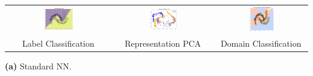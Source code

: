 \documentclass{article}
\begin{document}
\begin{minipage}{0.8\linewidth}
\centering
\begin{tabular}{ccc}
\includegraphics[width=0.3\textwidth]{DANN/label_decision_vanilla.png} &
\includegraphics[width=0.3\textwidth]{DANN/feature_vanilla.png} &
\includegraphics[width=0.3\textwidth]{DANN/domain_deciison_vanilla.png} \\
\small Label Classification & \small Representation PCA & \small Domain Classification
\end{tabular}
\end{minipage}

\vspace{0.0 cm}
\centering
\small\textbf{(a)} Standard NN.

\vspace{0.8cm}
\end{document}
